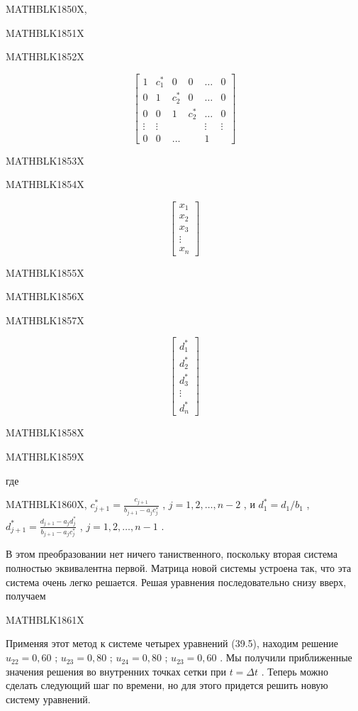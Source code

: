 \documentclass[
]{article}
\begin{document}
MATHBLK1850X,

MATHBLK1851X

MATHBLK1852X

\[
\begin{bmatrix} 1 & c_1^* & 0 & 0 & \dots & 0 \\ 0 & 1 & c_2^* & 0 & \dots & 0 \\ 0 & 0 & 1 & c_2^* & \dots & 0 \\ \vdots & \vdots & & & \vdots & \vdots \\ 0 & 0 & \dots & & 1 \end{bmatrix}
\]

MATHBLK1853X

MATHBLK1854X

\[
\begin{bmatrix} x_1 \\ x_2 \\ x_3 \\ \vdots \\ x_n \end{bmatrix}
\]

MATHBLK1855X

MATHBLK1856X

MATHBLK1857X

\[
\begin{bmatrix} d_1^* \\ d_2^* \\ d_3^* \\ \vdots \\ d_n^* \end{bmatrix}
\]

MATHBLK1858X

MATHBLK1859X

где

MATHBLK1860X, \(c_{j+1}^* = \frac{c_{j+1}}{b_{j+1} - a_j c_j^*}\) ,
\(j = 1, 2, \ldots, n-2\) , и \(d_1^* = d_1/b_1\) ,
\(d_{j+1}^* = \frac{d_{j+1} - a_j d_j^*}{b_{j+1} - a_j c_j^*}\) ,
\(j = 1, 2, \ldots, n-1\) .

В этом преобразовании нет ничего таниственного, поскольку вторая система
полностью эквивалентна первой. Матрица новой системы устроена так, что
эта система очень легко решается. Решая уравнения последовательно снизу
вверх, получаем

MATHBLK1861X

Применяя этот метод к системе четырех уравнений (39.5), находим решение
\(u_{22}=0,60\) ; \(u_{23}=0,80\) ; \(u_{24}=0,80\) ; \(u_{23}=0,60\) .
Мы получили приближенные значения решения во внутренних точках сетки при
\(t=\Delta t\) . Теперь можно сделать следующий шаг по времени, но для
этого придется решить новую систему уравнений.
\end{document}
